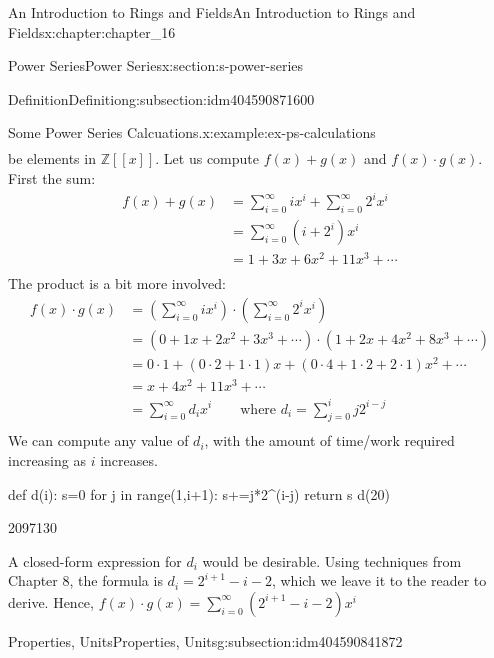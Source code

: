 \documentclass[twoside,10pt,]{book}
\numberwithin{equation}{section}
\begin{document}
\begin{chapterptx}{An Introduction to Rings and Fields}{}{An Introduction to Rings and Fields}{}{}{x:chapter:chapter_16}
\begin{sectionptx}{Power Series}{}{Power Series}{}{}{x:section:s-power-series}
\begin{subsectionptx}{Definition}{}{Definition}{}{}{g:subsection:idm404590871600}
\begin{example}{Some Power Series Calcuations.}{x:example:ex-ps-calculations}
\begin{equation*}
\begin{array}{c}
\end{array}
\end{equation*}
be elements in \(\mathbb{Z}[[x]]\).  Let us compute \(f(x) + g(x)\) and \(f(x)\cdot g(x)\).  First the sum:%
\begin{equation*}
\begin{split}
f(x) + g(x) & =\sum_{i=0}^{\infty } i x^i+\sum_{i=0}^{\infty } 2^i x^i\\
&=\sum_{i=0}^{\infty} \left(i+2^i\right) x^i\\
& =1+3x+6x^2+11x^3+ \cdots\\
\end{split}
\end{equation*}
The product is a bit more involved:%
\begin{equation*}
\begin{split}
f(x) \cdot g(x) & =\left(\sum_{i=0}^{\infty } i x^i\right)\cdot \left(\sum_{i=0}^{\infty } 2^i x^i\right)\\
&=\left(0+ 1 x+2 x^2+3x^3+ \cdots \right)\cdot \left(1 +2 x+4 x^2+8x^3+ \cdots \right)\\
&=0\cdot 1 + (0\cdot 2 + 1\cdot 1)x + (0\cdot 4+1\cdot 2+2\cdot 1)x^2+ \cdots\\
&= x + 4 x^2+ 11 x^3 + \cdots\\
&= \sum_{i=0}^{\infty } d_i x^i\quad\quad\textrm{where } d_i= \sum_{j=0}^i j 2^{i-j}\\
\end{split}
\end{equation*}
We can compute any value of \(d_i\), with the amount of time\slash{}work required increasing as \(i\) increases.%
\begin{sageinput}
def d(i):
    s=0
    for j in range(1,i+1):
        s+=j*2^(i-j)
    return s
d(20)
\end{sageinput}
\begin{sageoutput}
2097130
\end{sageoutput}
A closed-form expression for \(d_i\) would be desirable.  Using techniques from Chapter 8,  the formula is  \(d_i=2^{i+1}-i-2\), which we leave it to the reader to derive.  Hence, \(f(x)\cdot g(x) =\sum_{i=0}^{\infty } (2^{i+1}-i-2) x^i\)%
\end{example}
\end{subsectionptx}
%
%
\typeout{************************************************}
\typeout{************************************************}
%
\begin{subsectionptx}{Properties, Units}{}{Properties, Units}{}{}{g:subsection:idm404590841872}

\end{subsectionptx}
\end{sectionptx}
\end{chapterptx}
\end{document}
